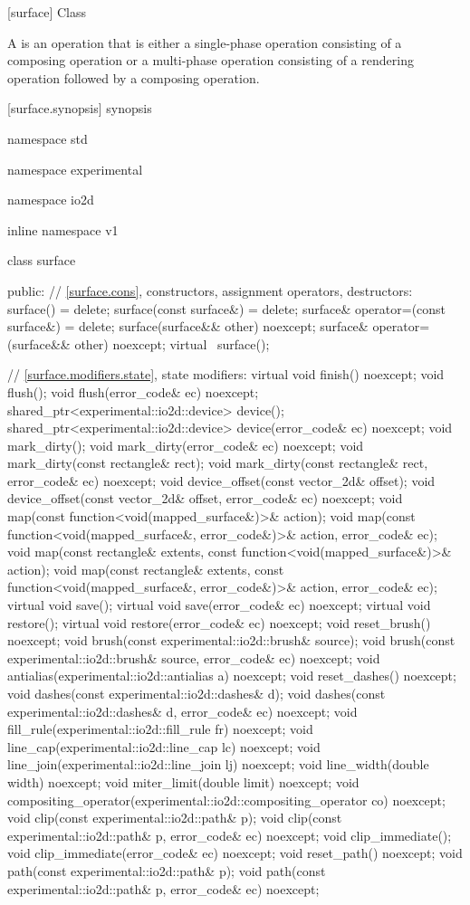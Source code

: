  [surface] {Class }

\pnum
A  is an operation that is either a single-phase operation consisting of a composing operation or a multi-phase operation consisting of a rendering operation followed by a composing operation.

 [surface.synopsis] { synopsis}

\begin{codeblock}
namespace std { namespace experimental { namespace io2d { inline namespace v1 {
  class surface {
  public:
    // \ref{surface.cons}, constructors, assignment operators, destructors:
    surface() = delete;
    surface(const surface&) = delete;
    surface& operator=(const surface&) = delete;
    surface(surface&& other) noexcept;
    surface& operator=(surface&& other) noexcept;
    virtual ~surface();

    // \ref{surface.modifiers.state}, state modifiers:
    virtual void finish() noexcept;
    void flush();
    void flush(error_code& ec) noexcept;
    shared_ptr<experimental::io2d::device> device();
    shared_ptr<experimental::io2d::device> device(error_code& ec) noexcept;
    void mark_dirty();
    void mark_dirty(error_code& ec) noexcept;
    void mark_dirty(const rectangle& rect);
    void mark_dirty(const rectangle& rect, error_code& ec) noexcept;
    void device_offset(const vector_2d& offset);
    void device_offset(const vector_2d& offset, error_code& ec) noexcept;
    void map(const function<void(mapped_surface&)>& action);
    void map(const function<void(mapped_surface&, error_code&)>& action,
      error_code& ec);
    void map(const rectangle& extents,
      const function<void(mapped_surface&)>& action);
    void map(const rectangle& extents,
      const function<void(mapped_surface&, error_code&)>& action,
      error_code& ec);
    virtual void save();
    virtual void save(error_code& ec) noexcept;
    virtual void restore();
    virtual void restore(error_code& ec) noexcept;
    void reset_brush() noexcept;
    void brush(const experimental::io2d::brush& source);
    void brush(const experimental::io2d::brush& source, error_code& ec)
      noexcept;
    void antialias(experimental::io2d::antialias a) noexcept;
    void reset_dashes() noexcept;
    void dashes(const experimental::io2d::dashes& d);
    void dashes(const experimental::io2d::dashes& d, error_code& ec) noexcept;
    void fill_rule(experimental::io2d::fill_rule fr) noexcept;
    void line_cap(experimental::io2d::line_cap lc) noexcept;
    void line_join(experimental::io2d::line_join lj) noexcept;
    void line_width(double width) noexcept;
    void miter_limit(double limit) noexcept;
    void compositing_operator(experimental::io2d::compositing_operator co)
      noexcept;
    void clip(const experimental::io2d::path& p);
    void clip(const experimental::io2d::path& p, error_code& ec) noexcept;
    void clip_immediate();
    void clip_immediate(error_code& ec) noexcept;
    void reset_path() noexcept;
    void path(const experimental::io2d::path& p);
    void path(const experimental::io2d::path& p, error_code& ec) noexcept;

}}}}}
\end{codeblock}
